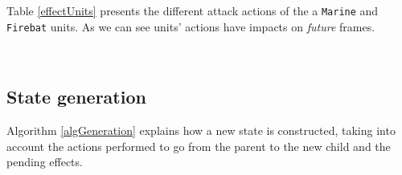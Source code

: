 Table \ref{effectUnits} presents the different attack actions of the a \texttt{Marine} and \texttt{Firebat} units.
As we can see units' actions have impacts on \emph{future} frames.

\begin{table}[h!t]
    \centering
{}
\\
\caption{Example of the delayed effects of actions}
\label{effectUnits}
\end{table}

\subsection{State generation}

Algorithm \ref{algGeneration} explains how a new state is constructed, taking into account the actions performed to go from the parent to the new child and the pending effects.

